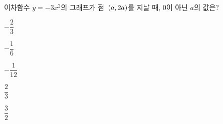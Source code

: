 이차함수 $y=-3x^2$의 그래프가 점~$(a{,}\mkern3mu 2a)$를 지날 때, $0$이 아닌 $a$의 값은?
\begin{choices32}{\rule[-3ex]{0pt}{8ex}$-\dfrac{2}{3}$}{\rule[-3ex]{0pt}{8ex}$-\dfrac{1}{6}$}{\rule[-3ex]{0pt}{8ex}$-\dfrac{1}{12}$}{\rule[-3ex]{0pt}{8ex}$\dfrac{2}{3}$}{\rule[-3ex]{0pt}{8ex}$\dfrac{3}{2}$}\end{choices32}
